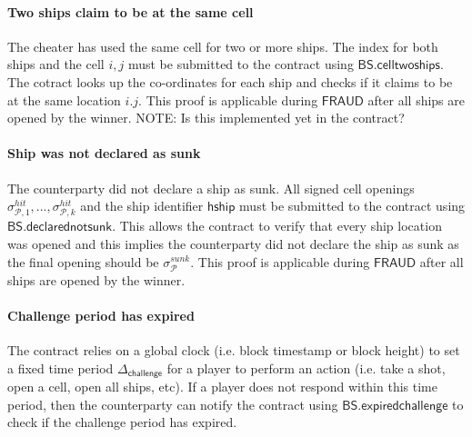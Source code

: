 \documentclass{llncs}
\newcommand{\gamefraud}{\mathsf{FRAUD}}
\newcommand{\hship}{\mathsf{hship}}
\newcommand{\participant}{\mathcal{P}}
\newcommand{\battleshipdeclarednotsunk}{\mathsf{BS.declarednotsunk}}
\newcommand{\battleshiptwoships}{\mathsf{BS.celltwoships}}
\newcommand{\battleshipchallengeexpired}{\mathsf{BS.expiredchallenge}}
\newcommand{\timerchallenge}{\mathsf{\Delta}_{\mathsf{challenge}}}
\begin{document}


\paragraph{Two ships claim to be at  the same cell} 
The cheater has used the same cell for two or more ships.  
The index for both ships and the cell $i,j$ must be submitted to the contract using $\battleshiptwoships$. 
The cotract looks up the co-ordinates for each ship and checks if it claims to be at the same location $i.j$.
This proof is applicable during $\gamefraud$ after all ships are opened by the winner. 
NOTE: Is this implemented yet in the contract? 

\paragraph{Ship was not declared as sunk}
The counterparty did not declare a ship as sunk. 
All signed cell openings $\sigma^{hit}_{\participant,1},...,\sigma^{hit}_{\participant,k}$ and the ship identifier $\hship$ must be submitted to the contract using $\battleshipdeclarednotsunk$. 
This allows the contract to verify that every ship location was opened and this implies the counterparty did not declare the ship as sunk as the final opening should be $\sigma^{sunk}_{\participant}$. 
This proof is applicable during $\gamefraud$ after all ships are opened by the winner. 

\paragraph{Challenge period has expired }
The contract relies on a global clock (i.e. block timestamp or block height) to set a fixed time period $\timerchallenge$ for a player to perform an action (i.e. take a shot, open a cell, open all ships, etc). 
If a player does not respond within this time period, then the counterparty can notify the contract using $\battleshipchallengeexpired$  to check if the challenge period has expired. 
\end{document}
